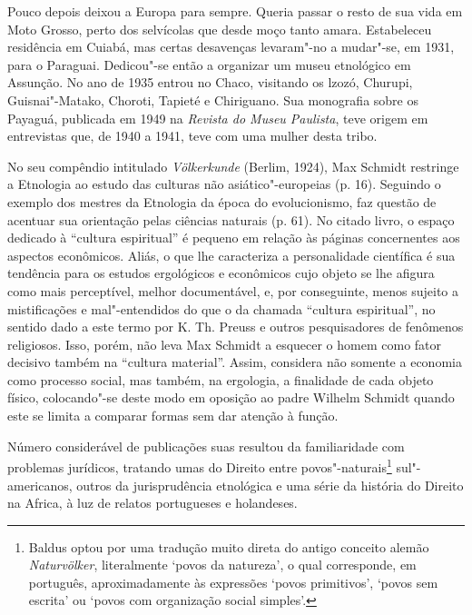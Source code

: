 Pouco depois deixou a Europa para sempre. Queria passar o resto de sua
vida em Moto Grosso, perto dos selvícolas que desde moço tanto amara.
Estabeleceu residência em Cuiabá, mas certas desavenças levaram"-no a
mudar"-se, em 1931, para o Paraguai. Dedicou"-se então a organizar um
museu etnológico em Assunção. No ano de 1935 entrou no Chaco, visitando
os lzozó, Churupi, Guisnai"-Matako, Choroti, Tapieté e Chiriguano. Sua
monografia sobre os Payaguá, publicada em 1949 na \emph{Revista do Museu
Paulista}, teve origem em entrevistas que, de 1940 a 1941, teve com uma
mulher desta tribo.

\asterisc

No seu compêndio intitulado \emph{Völkerkunde} (Berlim, 1924), Max
Schmidt restringe a Etnologia ao estudo das culturas não
asiático"-europeias (p. 16). Seguindo o exemplo dos mestres da Etnologia
da época do evolucionismo, faz questão de acentuar sua orientação pelas
ciências naturais (p. 61). No citado livro, o espaço dedicado à
``cultura espiritual'' é pequeno em relação às páginas concernentes aos
aspectos econômicos. Aliás, o que lhe caracteriza a personalidade
científica é sua tendência para os estudos ergológicos e econômicos cujo
objeto se lhe afigura como mais perceptível, melhor documentável, e, por
conseguinte, menos sujeito a mistificações e mal"-entendidos do que o da
chamada ``cultura espiritual'', no sentido dado a este termo por K. Th.
Preuss e outros pesquisadores de fenômenos religiosos. Isso, porém, não
leva Max Schmidt a esquecer o homem como fator decisivo também na
``cultura material''. Assim, considera não somente a economia como
processo social, mas também, na ergologia, a finalidade de cada objeto
físico, colocando"-se deste modo em oposição ao padre Wilhelm Schmidt
quando este se limita a comparar formas sem dar atenção à função.

Número considerável de publicações suas resultou da familiaridade com
problemas jurídicos, tratando umas do Direito entre
povos"-naturais\footnote{Baldus optou por uma tradução muito direta do
  antigo conceito alemão \emph{Naturvölker}, literalmente `povos da
  natureza', o qual corresponde, em português, aproximadamente às
  expressões `povos primitivos', `povos sem escrita' ou `povos com
  organização social simples'.} sul"-americanos, outros da jurisprudência
etnológica e uma série da história do Direito na Africa, à luz de
relatos portugueses e holandeses.

